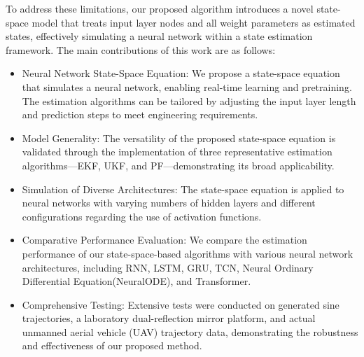 \documentclass[sn-nature]{sn-jnl}%
\theoremstyle{thmstyleone}%
\theoremstyle{thmstyletwo}%
\theoremstyle{thmstylethree}%
\begin{document}
To address these limitations, our proposed algorithm introduces a novel state-space model that treats input layer nodes and all weight parameters as estimated states, effectively simulating a neural network within a state estimation framework. The main contributions of this work are as follows:

\begin{itemize}
  
\item Neural Network State-Space Equation: We propose a state-space equation that simulates a neural network, enabling real-time learning and pretraining. The estimation algorithms can be tailored by adjusting the input layer length and prediction steps to meet engineering requirements.

\item Model Generality: The versatility of the proposed state-space equation is validated through the implementation of three representative estimation algorithms—EKF, UKF, and PF—demonstrating its broad applicability.

\item Simulation of Diverse Architectures: The state-space equation is applied to neural networks with varying numbers of hidden layers and different configurations regarding the use of activation functions.

\item Comparative Performance Evaluation: We compare the estimation performance of our state-space-based algorithms with various neural network architectures, including RNN, LSTM, GRU, TCN, Neural Ordinary Differential Equation(NeuralODE), and Transformer.

\item Comprehensive Testing: Extensive tests were conducted on generated sine trajectories, a laboratory dual-reflection mirror platform, and actual unmanned aerial vehicle (UAV) trajectory data, demonstrating the robustness and effectiveness of our proposed method.

\end{itemize}
\end{document}
